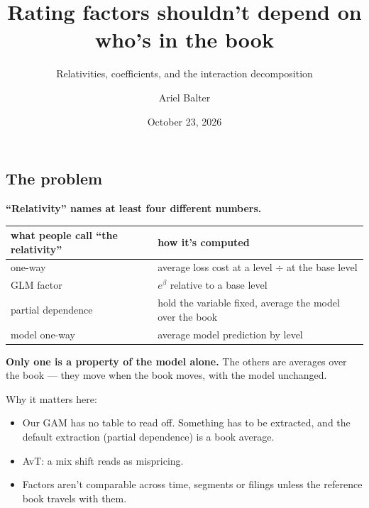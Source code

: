 \documentclass[
  letterpaper,
  DIV=11,
  numbers=noendperiod]{scrartcl}
\title{Rating factors shouldn't depend on who's in the book}
\subtitle{Relativities, coefficients, and the interaction decomposition}
\author{Ariel Balter}
\date{October 23, 2026}
\newcounter{none} %
\providecommand{\tightlist}{%
  \setlength{\itemsep}{0pt}\setlength{\parskip}{0pt}}
\begin{document}
\maketitle


\subsection{The problem}\label{problem}

\textbf{``Relativity'' names at least four different numbers.}

{\def\LTcaptype{none} %
\begin{longtable}[]{@{}
  >{\raggedright\arraybackslash}p{}
  >{\raggedright\arraybackslash}p{}@{}}
\toprule\noalign{}
\begin{minipage}[b]{\linewidth}\raggedright
what people call ``the relativity''
\end{minipage} & \begin{minipage}[b]{\linewidth}\raggedright
how it's computed
\end{minipage} \\
\midrule\noalign{}
\endhead
\bottomrule\noalign{}
\endlastfoot
one-way & average loss cost at a level \(\div\) at the base level \\
GLM factor & \(e^{\beta}\) relative to a base level \\
partial dependence & hold the variable fixed, average the model over the
book \\
model one-way & average model prediction by level \\
\end{longtable}
}

\textbf{Only one is a property of the model alone.} The others are
averages over the book --- they move when the book moves, with the model
unchanged.

Why it matters here:

\begin{itemize}
\tightlist
\item
  Our GAM has no table to read off. Something has to be extracted, and
  the default extraction (partial dependence) is a book average.
\item
  AvT: a mix shift reads as mispricing.
\item
  Factors aren't comparable across time, segments or filings unless the
  reference book travels with them.
\end{itemize}
\end{document}
